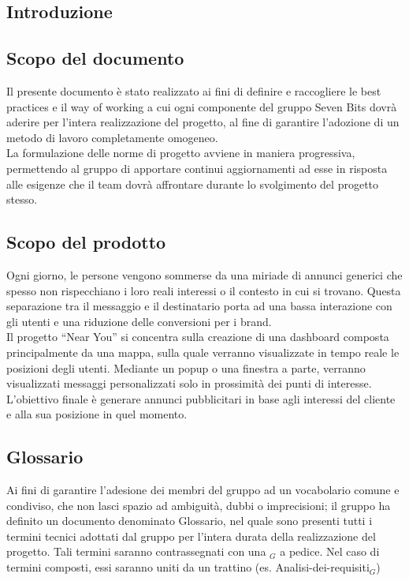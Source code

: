 \documentclass[10pt]{article}
\begin{document}
\newpage
\tableofcontents
\newpage
\listoffigures

\newpage
\begin{justify}

\section{Introduzione}
    \subsection{Scopo del documento}
    Il presente documento è stato realizzato ai fini di definire e raccogliere le best practices e il way of working a cui ogni componente del gruppo Seven Bits dovrà aderire per l'intera realizzazione del progetto, al fine di garantire l'adozione di un metodo di lavoro completamente omogeneo.\\
    La formulazione delle norme di progetto avviene in maniera progressiva, permettendo al gruppo di apportare continui aggiornamenti ad esse in risposta alle esigenze che il team dovrà affrontare durante lo svolgimento del progetto stesso.\\

    \subsection{Scopo del prodotto}
    Ogni giorno, le persone vengono sommerse da una miriade di annunci generici che spesso non rispecchiano i loro reali interessi o il contesto in cui si trovano. Questa separazione tra il messaggio e il destinatario porta ad una bassa interazione con gli utenti e una riduzione delle conversioni per i brand.\\
    Il progetto “Near You” si concentra sulla creazione di una dashboard composta principalmente da una mappa, sulla quale verranno visualizzate in tempo reale le posizioni degli utenti. Mediante un popup o una finestra a parte, verranno visualizzati messaggi personalizzati solo in prossimità dei punti di interesse.\\
    L'obiettivo finale è generare annunci pubblicitari in base agli interessi del cliente e alla sua posizione in quel momento.\\

    \subsection{Glossario}
    Ai fini di garantire l'adesione dei membri del gruppo ad un vocabolario comune e condiviso, che non lasci spazio ad ambiguità, dubbi o imprecisioni; il gruppo ha definito un documento denominato Glossario, nel quale sono presenti tutti i termini tecnici adottati dal gruppo per l'intera durata della realizzazione del progetto. Tali termini saranno contrassegnati con una $_G$ a pedice. Nel caso di termini composti, essi saranno uniti da un trattino (es. Analisi-dei-requisiti$_G$)


\end{justify}
\end{document}
